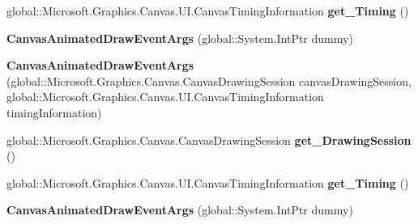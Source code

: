 \begin{DoxyCompactItemize}
global\+::\+Microsoft.\+Graphics.\+Canvas.\+U\+I.\+Canvas\+Timing\+Information {\bfseries get\+\_\+\+Timing} ()
\item 
\mbox{\label{class_microsoft_1_1_graphics_1_1_canvas_1_1_u_i_1_1_xaml_1_1_canvas_animated_draw_event_args_abfa7204a8fa459825847e3dc689bea45}} 
{\bfseries Canvas\+Animated\+Draw\+Event\+Args} (global\+::\+System.\+Int\+Ptr dummy)
\item 
\mbox{\label{class_microsoft_1_1_graphics_1_1_canvas_1_1_u_i_1_1_xaml_1_1_canvas_animated_draw_event_args_aac93ec47171428d3e94ed6fe14583c9b}} 
{\bfseries Canvas\+Animated\+Draw\+Event\+Args} (global\+::\+Microsoft.\+Graphics.\+Canvas.\+Canvas\+Drawing\+Session canvas\+Drawing\+Session, global\+::\+Microsoft.\+Graphics.\+Canvas.\+U\+I.\+Canvas\+Timing\+Information timing\+Information)
\item 
\mbox{\label{class_microsoft_1_1_graphics_1_1_canvas_1_1_u_i_1_1_xaml_1_1_canvas_animated_draw_event_args_abbbe03755eef9ce5bdf4d9c05a8f521d}} 
global\+::\+Microsoft.\+Graphics.\+Canvas.\+Canvas\+Drawing\+Session {\bfseries get\+\_\+\+Drawing\+Session} ()
\item 
\mbox{\label{class_microsoft_1_1_graphics_1_1_canvas_1_1_u_i_1_1_xaml_1_1_canvas_animated_draw_event_args_a22d34a76080b643c84026f8d7acaf7dc}} 
global\+::\+Microsoft.\+Graphics.\+Canvas.\+U\+I.\+Canvas\+Timing\+Information {\bfseries get\+\_\+\+Timing} ()
\item 
\mbox{\label{class_microsoft_1_1_graphics_1_1_canvas_1_1_u_i_1_1_xaml_1_1_canvas_animated_draw_event_args_abfa7204a8fa459825847e3dc689bea45}} 
{\bfseries Canvas\+Animated\+Draw\+Event\+Args} (global\+::\+System.\+Int\+Ptr dummy)
\item 
\mbox{\label{class_microsoft_1_1_graphics_1_1_canvas_1_1_u_i_1_1_xaml_1_1_canvas_animated_draw_event_args_aac93ec47171428d3e94ed6fe14583c9b}} 

\end{DoxyCompactItemize}
